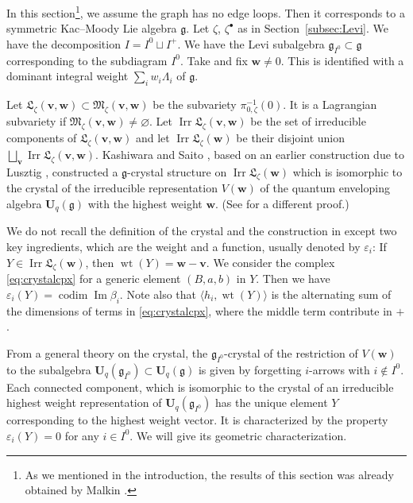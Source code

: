 \documentclass[pdftex]{sigma}
\theoremstyle{definition}
\numberwithin{equation}{section}
\newcommand{\subsecref}[1]{Section~\ref{#1}}
\newcommand{\defeq}{\overset{\operatorname{\scriptstyle def}}{=}}
\newcommand{\g}{{\mathfrak g}}
\newcommand{\Ima}{\operatorname{Im}}
\newcommand{\vin}[1]{\operatorname{i}(#1)} %
\newcommand{\M}{{\mathfrak M}} %
\newcommand{\La}{{\mathfrak L}} %
\newcommand{\bv}{{\mathbf v}} %
\newcommand{\bw}{{\mathbf w}} %
\newcommand{\codim}{\operatorname{codim}} %
\newcommand{\Uq}{{\mathbf U}_q(\mathfrak g)} %
\newcommand{\Un}{{\mathbf U}_q}
\newcommand{\Irr}{\operatorname{Irr}}
\begin{document}
In this section\footnote{As we mentioned in the introduction, the
  results of this section was already obtained by Malkin
  \cite{Malkin}.}, we assume the graph has no edge loops. Then it
corresponds to a symmetric Kac--Moody Lie algebra $\mathfrak g$.
%
Let $\zeta$, $\zeta^\bullet$ as in \subsecref{subsec:Levi}. We have the
decomposition $I = I^0\sqcup I^+$. We have the Levi subalgebra
$\mathfrak g_{I^0}\subset\mathfrak g$ corresponding to the subdiagram
$I^0$.
%
Take and f\/ix $\bw\neq 0$. This is identif\/ied with a dominant integral
weight $\sum_i w_i\Lambda_i$ of $\mathfrak g$.

Let $\La_\zeta(\bv,\bw)\subset\M_\zeta(\bv,\bw)$ be the subvariety
$\pi_{0,\zeta}^{-1}(0)$. It is a Lagrangian subvariety
\cite[5.8]{Na-quiver} if $\M_\zeta(\bv,\bw)\neq\varnothing$. Let
$\Irr\La_\zeta(\bv,\bw)$ be the set of irreducible components of
$\La_\zeta(\bv,\bw)$ and let $\Irr\La_\zeta(\bw)$ be their disjoint
union $\bigsqcup_\bv \Irr\La_\zeta(\bv,\bw)$.
%
Kashiwara and Saito \cite{KS,Saito}, based on an earlier construction
due to Lusztig \cite{Lu-crystal}, constructed a $\mathfrak g$-crystal
structure on $\Irr\La_\zeta(\bw)$ which is isomorphic to the crystal of the
irreducible representation $V(\bw)$ of the quantum enveloping algebra
$\Uq$ with the highest weight $\bw$. (See \cite{Na-tensor} for a
dif\/ferent proof.)

We do not recall the def\/inition of the crystal and the construction in
\cite{KS,Saito} except two key ingredients, which are the weight and
a function, usually denoted by $\varepsilon_i$: If
$Y\in\Irr\La_\zeta(\bw)$, then
\(
  \operatorname{wt}(Y) = \bw - \bv.
\)
We consider the complex \eqref{eq:crystalcpx}
for a generic element $(B,a,b)$ in $Y$. Then we have
$\varepsilon_i(Y) = \codim \Ima\beta_i$. Note also that
$\langle h_i, \operatorname{wt}(Y)\rangle$ is the alternating sum of
the dimensions of terms in \eqref{eq:crystalcpx}, where the middle
term contribute in $+$.

From a general theory on the crystal, the $\g_{I^0}$-crystal of the
restriction of $V(\bw)$ to the subalgebra $\Un(\g_{I^0})\subset \Uq$
is given by forgetting $i$-arrows with $i\notin I^0$. Each connected
component, which is isomorphic to the crystal of an irreducible
highest weight representation of $\Un(\g_{I^0})$ has the unique
element $Y$ corresponding to the highest weight vector. It is
characterized by the property $\varepsilon_i(Y) = 0$ for any $i\in
I^0$. We will give its geometric characterization.
\end{document}
